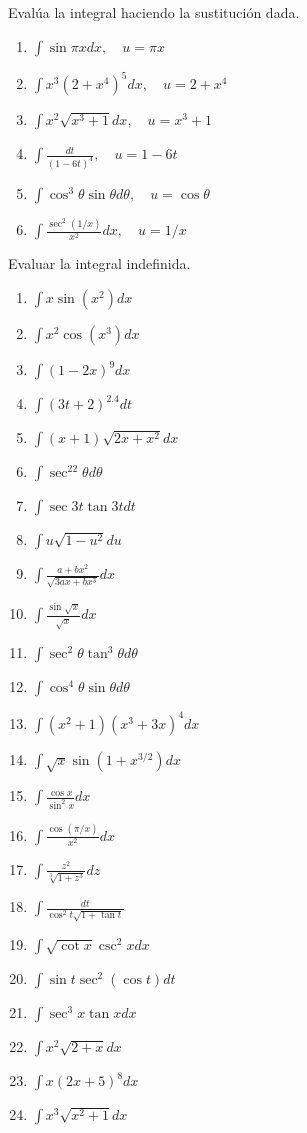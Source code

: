 \documentclass[12pt,]{article}
\begin{document}
Evalúa la integral haciendo la sustitución dada.

\begin{enumerate}
\def\labelenumi{\arabic{enumi}.}
\item
  \(\displaystyle\int\sin\pi x dx,\quad u=\pi x\)
\item
  \(\displaystyle\int x^3(2+x^4)^5dx,\quad u=2+x^4\)
\item
  \(\displaystyle\int x^2\sqrt{x^3+1}dx,\quad u=x^3+1\)
\item
  \(\displaystyle\int\frac{dt}{(1-6t)^4},\quad u=1-6t\)
\item
  \(\displaystyle\int\cos^3\theta\sin\theta d\theta,\quad u=\cos\theta\)
\item
  \(\displaystyle\int\frac{\sec^2(1/x)}{x^2}dx,\quad u=1/x\)
\end{enumerate}

Evaluar la integral indefinida.

\begin{enumerate}
\def\labelenumi{\arabic{enumi}.}
\setcounter{enumi}{6}
\item
  \(\displaystyle\int x\sin(x^2)dx\)
\item
  \(\displaystyle\int x^2\cos(x^3)dx\)
\item
  \(\displaystyle\int(1-2x)^9dx\)
\item
  \(\displaystyle\int(3t+2)^{2.4}dt\)
\item
  \(\displaystyle\int(x+1)\sqrt{2x+x^2}dx\)
\item
  \(\displaystyle\int\sec^22\theta d\theta\)
\item
  \(\displaystyle\int\sec3t\tan3t dt\)
\item
  \(\displaystyle\int u\sqrt{1-u^2}du\)
\item
  \(\displaystyle\int\frac{a+bx^2}{\sqrt{3ax+bx^3}}dx\)
\item
  \(\displaystyle\int\frac{\sin\sqrt{x}}{\sqrt{x}}dx\)
\item
  \(\displaystyle\int\sec^2\theta\tan^3\theta d\theta\)
\item
  \(\displaystyle\int\cos^4\theta\sin\theta d\theta\)
\item
  \(\displaystyle\int(x^2+1)(x^3+3x)^4dx\)
\item
  \(\displaystyle\int\sqrt{x}\sin(1+x^{3/2})dx\)
\item
  \(\displaystyle\int\frac{\cos x}{\sin^2 x}dx\)
\item
  \(\displaystyle\int\frac{\cos(\pi/x)}{x^2}dx\)
\item
  \(\displaystyle\int\frac{z^2}{\sqrt[3]{1+z^3}}dz\)
\item
  \(\displaystyle\int\frac{dt}{\cos^2t\sqrt{1+\tan t}}\)
\item
  \(\displaystyle\int\sqrt{\cot x}\csc^2 xdx\)
\item
  \(\displaystyle\int\sin t \sec^2(\cos t)dt\)
\item
  \(\displaystyle\int\sec^3 x \tan x dx\)
\item
  \(\displaystyle\int x^2\sqrt{2+x}dx\)
\item
  \(\displaystyle\int x(2x+5)^8dx\)
\item
  \(\displaystyle\int x^3\sqrt{x^2+1}dx\)
\end{enumerate}
\end{document}
